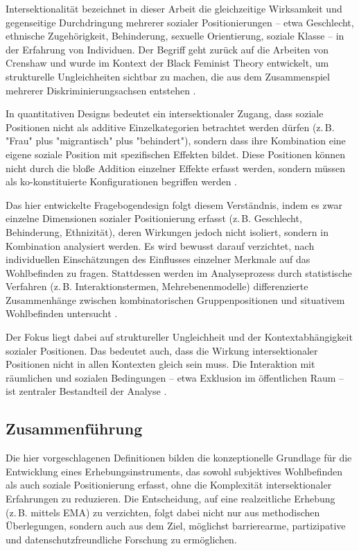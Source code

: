 Intersektionalität bezeichnet in dieser Arbeit die gleichzeitige Wirksamkeit und gegenseitige Durchdringung mehrerer sozialer Positionierungen – etwa Geschlecht, ethnische Zugehörigkeit, Behinderung, sexuelle Orientierung, soziale Klasse – in der Erfahrung von Individuen. Der Begriff geht zurück auf die Arbeiten von Crenshaw und wurde im Kontext der Black Feminist Theory entwickelt, um strukturelle Ungleichheiten sichtbar zu machen, die aus dem Zusammenspiel mehrerer Diskriminierungsachsen entstehen \parencite{crenshaw1991, bauerIntersectionalityQuantitativeResearch2021}.

In quantitativen Designs bedeutet ein intersektionaler Zugang, dass soziale Positionen nicht als additive Einzelkategorien betrachtet werden dürfen (z. B. "Frau" plus "migrantisch" plus "behindert"), sondern dass ihre Kombination eine eigene soziale Position mit spezifischen Effekten bildet. Diese Positionen können nicht durch die bloße Addition einzelner Effekte erfasst werden, sondern müssen als ko-konstituierte Konfigurationen begriffen werden \parencite{hancock2007, bauerIntersectionalityQuantitativeResearch2021}.

Das hier entwickelte Fragebogendesign folgt diesem Verständnis, indem es zwar einzelne Dimensionen sozialer Positionierung erfasst (z. B. Geschlecht, Behinderung, Ethnizität), deren Wirkungen jedoch nicht isoliert, sondern in Kombination analysiert werden. Es wird bewusst darauf verzichtet, nach individuellen Einschätzungen des Einflusses einzelner Merkmale auf das Wohlbefinden zu fragen. Stattdessen werden im Analyseprozess durch statistische Verfahren (z. B. Interaktionstermen, Mehrebenenmodelle) differenzierte Zusammenhänge zwischen kombinatorischen Gruppenpositionen und situativem Wohlbefinden untersucht \parencite{bauerIntersectionalityQuantitativeResearch2021}.

Der Fokus liegt dabei auf struktureller Ungleichheit und der Kontextabhängigkeit sozialer Positionen. Das bedeutet auch, dass die Wirkung intersektionaler Positionen nicht in allen Kontexten gleich sein muss. Die Interaktion mit räumlichen und sozialen Bedingungen – etwa Exklusion im öffentlichen Raum – ist zentraler Bestandteil der Analyse \parencite{rodo-de-zarateDevelopingGeographiesIntersectionality2014}.

\subsection*{Zusammenführung}

Die hier vorgeschlagenen Definitionen bilden die konzeptionelle Grundlage für die Entwicklung eines Erhebungsinstruments, das sowohl subjektives Wohlbefinden als auch soziale Positionierung erfasst, ohne die Komplexität intersektionaler Erfahrungen zu reduzieren. Die Entscheidung, auf eine realzeitliche Erhebung (z. B. mittels EMA) zu verzichten, folgt dabei nicht nur aus methodischen Überlegungen, sondern auch aus dem Ziel, möglichst barrierearme, partizipative und datenschutzfreundliche Forschung zu ermöglichen.
